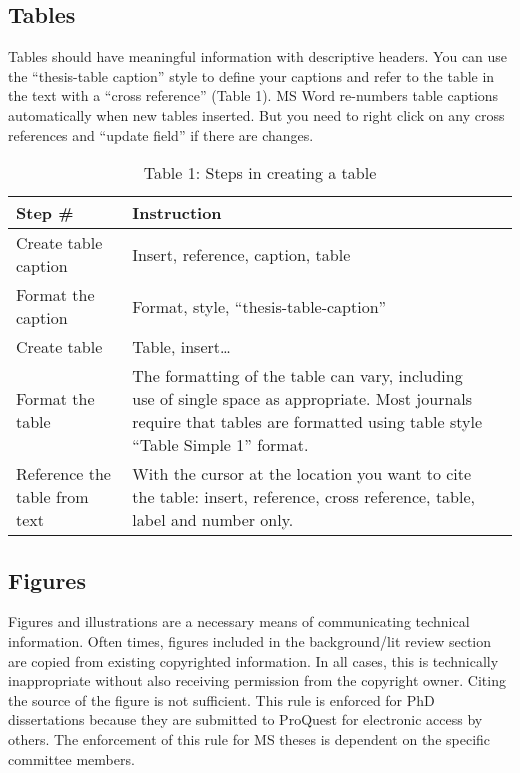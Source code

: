 \subsection{Tables}

Tables should have meaningful information with descriptive headers.  You can use the “thesis-table caption” style to define your captions and refer to the table in the text with a “cross reference” (Table 1).  MS Word re-numbers table captions automatically when new tables inserted.  But you need to right click on any cross references and “update field” if there are changes.

\begin{table}[h!]
  \centering
  \begin{tabularx}{0.8\textwidth} {
    | >{\centering\arraybackslash}X 
    | >{\centering\arraybackslash}X 
    | >{\centering\arraybackslash}X |
  }
    \hline
      Step \# & Instruction \\ 
    \hline
      Create table caption & Insert, reference, caption, table \\ 
    \hline
      Format the caption & Format, style, “thesis-table-caption” \\ 
    \hline
      Create table & Table, insert… \\
    \hline
      Format the table & The formatting of the table can vary, including use of single space as appropriate. Most journals require that tables are formatted using table style “Table Simple 1” format. \\
    \hline
      Reference the table from text & With the cursor at the location you want to cite the table: insert, reference, cross reference, table, label and number only. \\
    \hline
  \end{tabularx}
  \caption{Table 1: Steps in creating a table}
  \label{table:1}
\end{table}

\subsection{Figures}

Figures and illustrations are a necessary means of communicating technical information.  Often times, figures included in the background/lit review section are copied from existing copyrighted information.  In all cases, this is technically inappropriate without also receiving permission from the copyright owner.  Citing the source of the figure is not sufficient. This rule is enforced for PhD dissertations because they are submitted to ProQuest for electronic access by others.  The enforcement of this rule for MS theses is dependent on the specific committee members.

